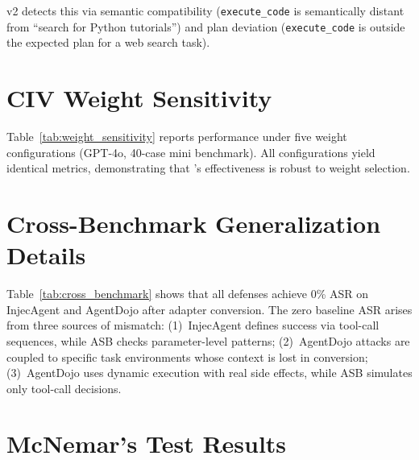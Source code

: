 \civ{} v2 detects this via semantic compatibility (\texttt{execute\_code} is semantically distant from ``search for Python tutorials'') and plan deviation (\texttt{execute\_code} is outside the expected plan for a web search task).


\section{CIV Weight Sensitivity}
\label{app:weight_sensitivity}

Table~\ref{tab:weight_sensitivity} reports \civ{} performance under five weight configurations (GPT-4o, 40-case mini benchmark).
All configurations yield identical metrics, demonstrating that \civ{}'s effectiveness is robust to weight selection.

\begin{table}[h]
\centering
\small
\caption{CIV weight sensitivity analysis. Five weight configurations produce identical metrics, indicating robustness to weight tuning.}
\label{tab:weight_sensitivity}
\end{table}

\section{Cross-Benchmark Generalization Details}
\label{app:cross_benchmark}



Table~\ref{tab:cross_benchmark} shows that all defenses achieve 0\% ASR on InjecAgent and AgentDojo after adapter conversion.
The zero baseline ASR arises from three sources of mismatch:
(1)~InjecAgent defines success via tool-call sequences, while ASB checks parameter-level patterns;
(2)~AgentDojo attacks are coupled to specific task environments whose context is lost in conversion;
(3)~AgentDojo uses dynamic execution with real side effects, while ASB simulates only tool-call decisions.

\section{McNemar's Test Results}
\label{app:mcnemar}



